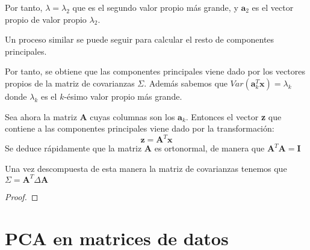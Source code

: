 \noindent Por tanto, $\lambda=\lambda_2$ que es el segundo valor propio más grande, y $\textbf{a}_2$ es el vector propio de valor propio $\lambda_2$.

\noindent Un proceso similar se puede seguir para calcular el resto de componentes principales. 

\noindent Por tanto, se obtiene que las componentes principales viene dado por los vectores propios de la matriz de covarianzas $\Sigma $. Además sabemos que $Var(\textbf{a}_k^T \textbf{x})=\lambda_k$ donde $\lambda_k$ es el $k$-ésimo valor propio más grande. 

\noindent Sea ahora la matriz $\textbf{A}$ cuyas columnas son los $\textbf{a}_k$. Entonces el vector \textbf{z} que contiene a las componentes principales viene dado por la transformación:
\begin{equation}
\textbf{z}=\textbf{A}^T\textbf{x}
\end{equation}
\noindent Se deduce rápidamente que la matriz $\textbf{A}$ es ortonormal, de manera que $\textbf{A}^T\textbf{A}=\textbf{I}$

\noindent Una vez descompuesta de esta manera la matriz de covarianzas tenemos 
que $\Sigma=\textbf{A}^T\Delta \textbf{A}$

\begin{propo}

\begin{proof}

\end{proof}
\end{propo}
\newpage

\section{PCA en matrices de datos}

